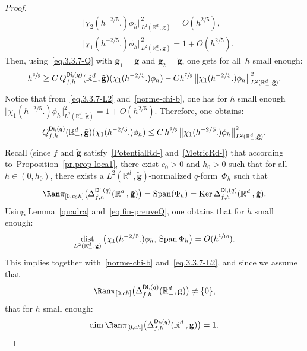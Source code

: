 \documentclass[10pt]{amsart}
\DeclareMathOperator{\dist}{dist}
\DeclareMathOperator{\Span}{Span}
\newcommand{\mbf}[1]{\mathbf{#1}}
\DeclareMathOperator\Ker{Ker}
\theoremstyle{plain}
\theoremstyle{definition}
\begin{document}
\begin{proof}
\begin{equation}
\begin{aligned}
&\big\Vert \chi_2(h^{-2/5 }.) \phi_h\big \Vert_{L^2(\mathbb R^d_-,\mbf g)}^2 =O (h^{2/5 }), \\
& \big\Vert \chi_1(h^{-2/5
}.) \phi_h\big\Vert_{L^2(\mathbb R^d_-,\mbf g)}^2=1+O (h^{2/5 }).
\end{aligned}
\end{equation}
Then, using~\eqref{eq.3.3.7-Q} with $\mbf g_1=\mbf g$ and $\mbf g_2=\tilde{\mbf g}$, one gets for all~$h$ small enough:\vspace*{-3pt}
\[
h^{\sfrac 65} \ge C\, Q_{f,h}^{\mathsf{Di},(q)}(\mathbb R^d_-,\tilde{\mbf g})(\chi_1(h^{-2/5 }.)\phi_h)- Ch^{\sfrac 75}\, \big \Vert \chi_1(h^{-2/5 }.)\phi_h\big \Vert_{L^2(\mathbb R^d_-,\tilde{\mbf g})}^2.
\]
Notice that from~\eqref{eq.3.3.7-L2} and~\eqref{norme-chi-b}, one has
for $h$ small enough
$ \Vert \chi_1(h^{-2/5 }.)\phi_h\big \Vert_{L^2(\mathbb R^d_-,\tilde{\mbf g})}^2=1+O(h^{2/5 })$.
Therefore, one obtains:\vspace*{-3pt}
\begin{align}\label{eq.fin-preuveQ}
Q_{f,h}^{\mathsf{Di},(q)}(\mathbb R^d_-,\tilde{\mbf g})(\chi_1(h^{-2/5 }.)\phi_h) \le C \, h^{\sfrac 65} \, \big \Vert \chi_1(h^{-2/5 }.)\phi_h\big \Vert_{L^2(\mathbb R^d_-,\tilde{\mbf g})}^2.
\end{align}
Recall (since $f$ and $\tilde{\mbf g}$ satisfy~\ref{PotentialRd-} and~\ref{MetricRd-}) that according to~Proposition~\ref{pr.prop-loca1}, there exist $c_0>0$ and $h_0>0$ such that for all $h\in (0,h_0)$, there exists a $L^2(\mathbb R^d_-,\tilde{\mbf g})$-normalized $q$-form~$\Phi_h$ such that
\begin{equation}\label{eq.PHIH}
\Ran \pi_{[0,c_0h]}\bigl(\Delta_{f,h}^{\mathsf{Di},(q)}(\mathbb R_-^d,\tilde{\mbf g})\bigr)=\Span (\Phi_h)=\Ker \Delta_{f,h}^{\mathsf{Di},(q)}(\mathbb R_-^d,\tilde{\mbf g}).
\end{equation}
Using Lemma~\ref{quadra} and~\eqref{eq.fin-preuveQ}, one obtains that for $h$ small enough:
\begin{align*}
\dist_{L^2(\mathbb R_-^d,\tilde{\mbf g})}\, \bigl(\chi_1(h^{-2/5 }.)\phi_h,\, \Span \Phi_h \bigr)= O(h^{\sfrac{1}{10}}).
\end{align*}
This implies together with~\eqref{norme-chi-b}
and~\eqref{eq.3.3.7-L2}, and since we assume that
\[
\Ran \pi_{[0,ch]}\bigl(\Delta_{f,h}^{\mathsf{Di},(q)}(\mathbb R_-^d, \mbf g) \bigr)\neq \{0\},
\]
that for $h$ small enough:
\[
\dim \Ran \pi_{[0,ch]}\bigl(\Delta_{f,h}^{\mathsf{Di},(q)}(\mathbb R^d_-,\mbf g)\bigr)= 1.
\]


\end{proof}
\end{document}
